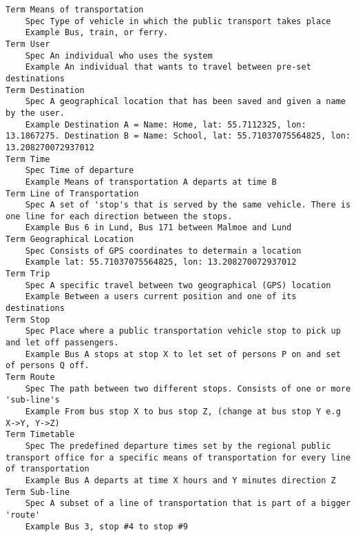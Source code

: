 

\begin{lstlisting}
Term Means of transportation
	Spec Type of vehicle in which the public transport takes place
	Example Bus, train, or ferry.
Term User
	Spec An individual who uses the system
	Example An individual that wants to travel between pre-set destinations
Term Destination
	Spec A geographical location that has been saved and given a name by the user.
	Example Destination A = Name: Home, lat: 55.7112325, lon: 13.1867275. Destination B = Name: School, lat: 55.71037075564825, lon: 13.208270072937012
Term Time
	Spec Time of departure
	Example Means of transportation A departs at time B
Term Line of Transportation
	Spec A set of 'stop's that is served by the same vehicle. There is one line for each direction between the stops.
	Example Bus 6 in Lund, Bus 171 between Malmoe and Lund
Term Geographical Location
	Spec Consists of GPS coordinates to determain a location
	Example lat: 55.71037075564825, lon: 13.208270072937012
Term Trip
	Spec A specific travel between two geographical (GPS) location
	Example Between a users current position and one of its destinations
Term Stop
	Spec Place where a public transportation vehicle stop to pick up and let off passengers.
	Example Bus A stops at stop X to let set of persons P on and set of persons Q off.
Term Route
	Spec The path between two different stops. Consists of one or more 'sub-line's
	Example From bus stop X to bus stop Z, (change at bus stop Y e.g X->Y, Y->Z)
Term Timetable
	Spec The predefined departure times set by the regional public transport office for a specific means of transportation for every line of transportation
	Example Bus A departs at time X hours and Y minutes direction Z
Term Sub-line
	Spec A subset of a line of transportation that is part of a bigger 'route'
	Example Bus 3, stop #4 to stop #9

\end{lstlisting}